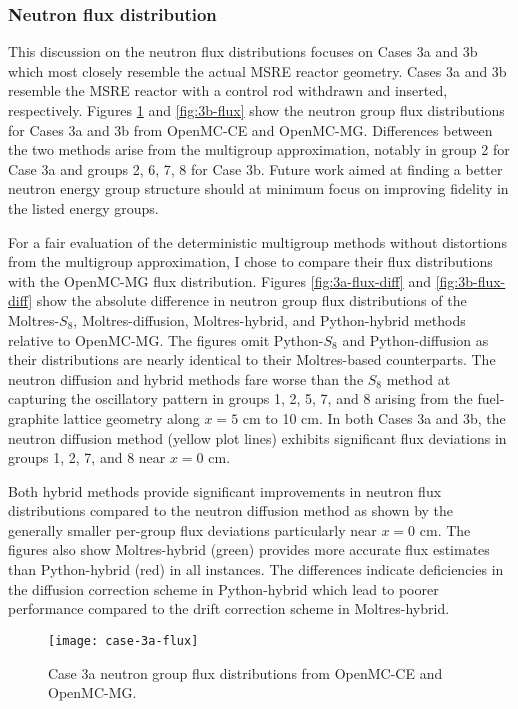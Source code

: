 \subsubsection{Neutron flux distribution}

This discussion on the neutron flux distributions focuses on Cases 3a and 3b which most closely
resemble the actual \gls{MSRE} reactor geometry. Cases 3a and 3b resemble the \gls{MSRE} reactor
with a control rod withdrawn and inserted, respectively. Figures \ref{fig:3a-flux} and
\ref{fig:3b-flux} show the neutron group flux distributions for Cases 3a and 3b from OpenMC-CE and
OpenMC-MG. Differences between the two methods arise from the multigroup approximation, notably in
group 2 for Case 3a and groups 2, 6, 7, 8 for Case 3b. Future work aimed at finding a better
neutron energy group structure should at minimum focus on improving fidelity in the listed energy
groups.

For a fair evaluation of the deterministic multigroup methods without distortions from the
multigroup approximation, I chose to compare their flux distributions with the OpenMC-MG flux
distribution. Figures \ref{fig:3a-flux-diff} and \ref{fig:3b-flux-diff} show the absolute
difference in neutron group flux distributions of the Moltres-$S_8$, Moltres-diffusion,
Moltres-hybrid, and Python-hybrid methods relative to OpenMC-MG. The figures omit Python-$S_8$ and
Python-diffusion as their distributions are nearly identical to their Moltres-based counterparts.
The neutron diffusion and hybrid methods fare worse than the $S_8$ method at capturing the
oscillatory pattern in groups 1, 2, 5, 7, and 8 arising from the fuel-graphite lattice geometry
along $x=5$ cm to 10 cm. In both Cases 3a and 3b, the neutron diffusion method (yellow plot lines)
exhibits significant flux deviations in groups 1, 2, 7, and 8 near $x=0$ cm.

Both hybrid methods
provide significant improvements in neutron flux distributions compared to the neutron diffusion
method as shown by the generally smaller per-group flux deviations particularly near $x=0$ cm. The
figures also show Moltres-hybrid (green) provides more accurate flux estimates than
Python-hybrid (red) in all instances. The differences indicate deficiencies in the diffusion
correction scheme in Python-hybrid which lead to poorer performance compared to the drift
correction scheme in Moltres-hybrid.

\begin{figure}[p]
  \centering
  \texttt{[image: case-3a-flux]}
  \caption{Case 3a neutron group flux distributions from OpenMC-CE and OpenMC-MG.}
  \label{fig:3a-flux}
\end{figure}

